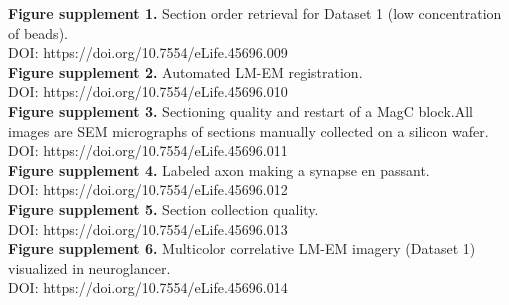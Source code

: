 \documentclass{article}
\begin{document}
\noindent \textbf{Figure supplement 1.} Section order retrieval for Dataset 1 (low concentration of beads).\\
DOI: https://doi.org/10.7554/eLife.45696.009\\
\textbf{Figure supplement 2.} Automated LM-EM registration.\\
DOI: https://doi.org/10.7554/eLife.45696.010\\
\textbf{Figure supplement 3.} Sectioning quality and restart of a MagC block.All images are SEM micrographs of sections manually collected on a silicon wafer.\\
DOI: https://doi.org/10.7554/eLife.45696.011\\
\textbf{Figure supplement 4.} Labeled axon making a synapse en passant.\\
DOI: https://doi.org/10.7554/eLife.45696.012\\
\textbf{Figure supplement 5.} Section collection quality.\\
DOI: https://doi.org/10.7554/eLife.45696.013\\
\textbf{Figure supplement 6.} Multicolor correlative LM-EM imagery (Dataset 1) visualized in neuroglancer.\\
DOI: https://doi.org/10.7554/eLife.45696.014
\end{document}
